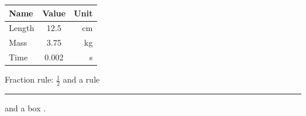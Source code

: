 \documentclass{article}
\begin{document}
\begin{tabular}{|l|c|r|}
\hline
Name & Value & Unit \\ \hline\hline
Length & 12.5 & cm \\ \hline
Mass & 3.75 & kg \\ \hline
Time & 0.002 & s \\ \hline
\end{tabular}

\bigskip
Fraction rule: $\frac{1}{2}$ and a rule \rule{3cm}{1pt} and a box
.
\end{document}
